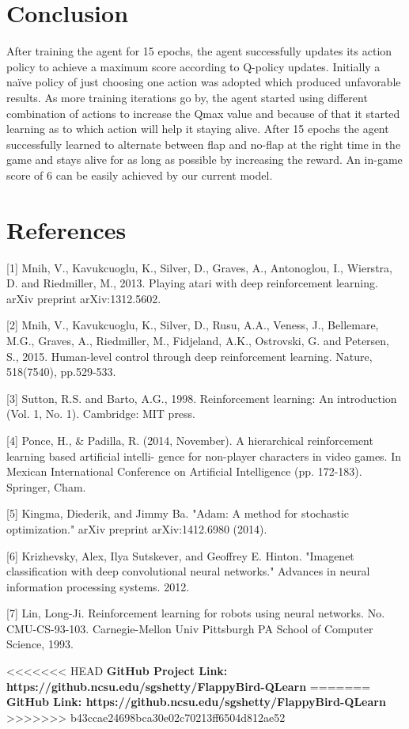 \documentclass{article}
\begin{document}
\section{Conclusion}

After training the agent for 15 epochs, the agent successfully updates its action policy to achieve a maximum score according to Q-policy updates. Initially a naïve policy of just choosing one action was adopted which produced unfavorable results. As more training iterations go by, the agent started using different combination of actions to increase the Qmax value and because of that it started learning as to which action will help it staying alive. After 15 epochs the agent successfully learned to alternate between flap and no-flap at the right time in the game and stays alive for as long as possible by increasing the reward. An in-game score of 6 can be easily achieved by our current model. 

\section*{References}

\small

[1] \label{pap1}Mnih, V., Kavukcuoglu, K., Silver, D., Graves, A., Antonoglou, I., Wierstra, D. and Riedmiller, M., 2013. Playing atari with deep reinforcement learning. arXiv preprint arXiv:1312.5602.

[2] Mnih, V., Kavukcuoglu, K., Silver, D., Rusu, A.A., Veness, J., Bellemare, M.G., Graves, A., Riedmiller, M., Fidjeland, A.K., Ostrovski, G. and Petersen, S., 2015. Human-level control through deep reinforcement learning. Nature, 518(7540), pp.529-533.

[3] Sutton, R.S. and Barto, A.G., 1998. Reinforcement learning: An introduction (Vol. 1, No. 1). Cambridge: MIT press.

[4] Ponce, H., \& Padilla, R. (2014, November). A hierarchical reinforcement learning based artificial intelli- gence for non-player characters in video games. In Mexican International Conference on Artificial Intelligence (pp. 172-183). Springer, Cham.

[5] Kingma, Diederik, and Jimmy Ba. "Adam: A method for stochastic optimization." arXiv preprint arXiv:1412.6980 (2014).

[6]	Krizhevsky, Alex, Ilya Sutskever, and Geoffrey E. Hinton. "Imagenet classification with deep convolutional neural networks." Advances in neural information processing systems. 2012.

[7]	Lin, Long-Ji. Reinforcement learning for robots using neural networks. No. CMU-CS-93-103. Carnegie-Mellon Univ Pittsburgh PA School of Computer Science, 1993.

<<<<<<< HEAD
\textbf{GitHub Project Link: https://github.ncsu.edu/sgshetty/FlappyBird-QLearn}
=======
\textbf{GitHub Link: https://github.ncsu.edu/sgshetty/FlappyBird-QLearn}
>>>>>>> b43ccae24698bca30e02c70213ff6504d812ae52
\end{document}
